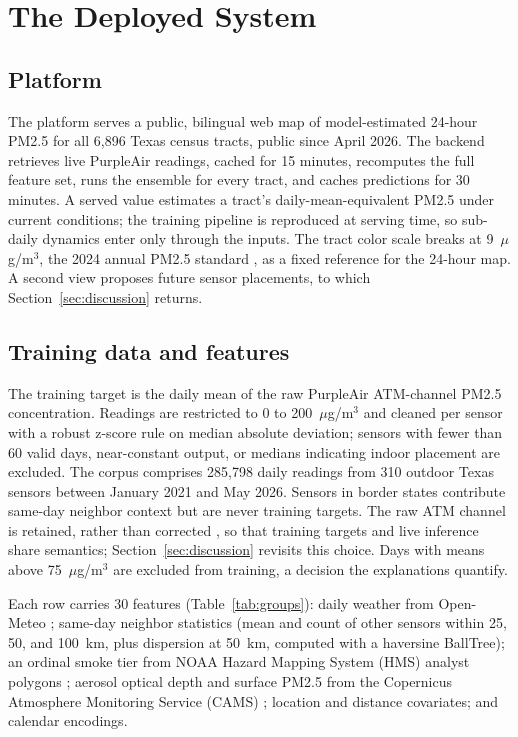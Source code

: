 \documentclass[conference]{IEEEtran}
\newcommand{\ugm}{$\mu$g/m$^3$}
\begin{document}
\section{The Deployed System}
\label{sec:system}
\subsection{Platform}
The platform serves a public, bilingual web map of model-estimated
24-hour PM2.5 for all 6,896 Texas census tracts, public since April 2026.
The backend retrieves live PurpleAir readings, cached for 15 minutes,
recomputes the full feature set, runs the ensemble for every tract, and
caches predictions for 30 minutes. A served value estimates a tract's
daily-mean-equivalent PM2.5 under current conditions; the training
pipeline is reproduced at serving time, so sub-daily dynamics enter only
through the inputs. The
tract color scale breaks at 9~\ugm{}, the 2024 annual PM2.5 standard
\cite{epa2024naaqs}, as a fixed reference for the 24-hour map. A second view proposes future sensor placements, to which
Section~\ref{sec:discussion} returns.

\subsection{Training data and features}
The training target is the daily mean of the raw PurpleAir ATM-channel
PM2.5 concentration. Readings are restricted to 0 to 200~\ugm{} and
cleaned per sensor with a robust z-score rule on median absolute
deviation; sensors with fewer than 60 valid days, near-constant output,
or medians indicating indoor placement are excluded. The corpus comprises
285,798 daily readings from 310 outdoor Texas sensors between January
2021 and May 2026. Sensors in border states contribute
same-day neighbor context but are never training targets. The raw ATM
channel is retained, rather than corrected \cite{barkjohn2021}, so that
training targets and live inference share semantics;
Section~\ref{sec:discussion} revisits this choice. Days with means above
75~\ugm{} are excluded from training, a decision the explanations
quantify.

Each row carries 30 features (Table~\ref{tab:groups}): daily weather from
Open-Meteo \cite{zippenfenig}; same-day neighbor statistics (mean and
count of other sensors within 25, 50, and 100~km, plus dispersion at
50~km, computed with a haversine BallTree); an ordinal smoke tier from
NOAA Hazard Mapping System (HMS) analyst polygons \cite{brey2018};
aerosol optical depth and surface PM2.5 from the Copernicus Atmosphere
Monitoring Service (CAMS) \cite{peuch2022}; location and distance
covariates; and calendar encodings.
\end{document}
